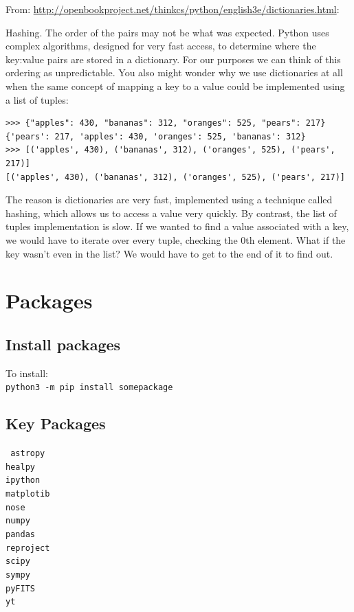 \documentclass[11pt,a4paper]{article}
\begin{document}
\noindent
From:
\href{http://openbookproject.net/thinkcs/python/english3e/dictionaries.html}{http://openbookproject.net/thinkcs/python/english3e/dictionaries.html}:

Hashing. The order of the pairs may not be what was expected. Python
uses complex algorithms, designed for very fast access, to determine
where the key:value pairs are stored in a dictionary. For our purposes
we can think of this ordering as unpredictable.  You also might wonder
why we use dictionaries at all when the same concept of mapping a key
to a value could be implemented using a list of tuples:
\begin{lstlisting}
>>> {"apples": 430, "bananas": 312, "oranges": 525, "pears": 217}
{'pears': 217, 'apples': 430, 'oranges': 525, 'bananas': 312}
>>> [('apples', 430), ('bananas', 312), ('oranges', 525), ('pears', 217)]
[('apples', 430), ('bananas', 312), ('oranges', 525), ('pears', 217)]
\end{lstlisting}

The reason is dictionaries are very fast, implemented using a
technique called hashing, which allows us to access a value very
quickly. By contrast, the list of tuples implementation is slow. If we
wanted to find a value associated with a key, we would have to iterate
over every tuple, checking the 0th element. What if the key wasn’t
even in the list? We would have to get to the end of it to find out.


\newpage
\section{Packages}

\subsection{Install packages}

\noindent
To install: \\
{\tt python3 -m pip install somepackage}


\subsection{Key Packages}
{\tt
astropy \\
healpy\\
ipython \\ 
matplotib\\
nose \\
numpy\\
pandas \\
reproject\\
scipy \\
sympy \\ 
pyFITS\\
yt\\
}
\end{document}
